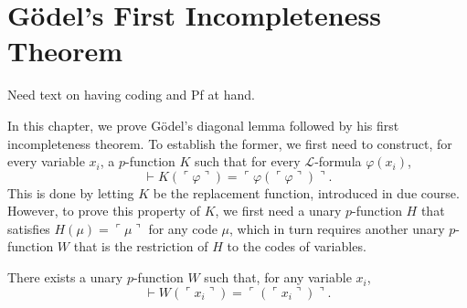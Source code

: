 \chapter{Gödel’s First Incompleteness Theorem}

Need text on having coding and Pf at hand.

In this chapter, we prove Gödel’s diagonal lemma followed by his first incompleteness theorem.
To establish the former, we first need to construct, for every variable $x_i$, 
a $p$-function $K$ such that for every $\mathcal{L}$-formula $\varphi(x_i)$,
$$
\vdash K (\ulcorner{\varphi}\urcorner) = \ulcorner{\varphi(\ulcorner {\varphi} \urcorner)}\urcorner.
$$
This is done by letting $K$ be the replacement function, introduced in due course.
However, to prove this property of $K$, we first need a unary $p$-function $H$
that satisfies $H(\mu) = \ulcorner {\mu} \urcorner$ for any code $\mu$, which in turn requires
another unary $p$-function $W$ that is the restriction of $H$ to the codes of variables.

\begin{lemma}
    \label{lem:Code.exists_pFunc_forall_var_eq_code}
    There exists a unary $p$-function $W$ such that, for any variable $x_i$,
    $$
    \vdash W(\ulcorner{x_i}\urcorner) = \ulcorner{(\ulcorner{x_i}\urcorner)}\urcorner.
    $$
\end{lemma}

